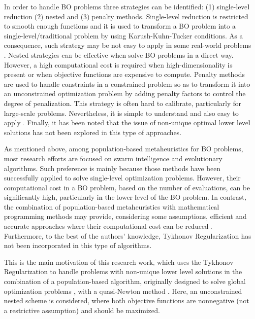 \documentclass[conference]{IEEEtran}
\theoremstyle{definition}
\begin{document}
In order to handle BO problems three strategies can be identified: (1) single-level
reduction (2) nested and (3) penalty methods. Single-level reduction is restricted
to smooth enough functions and it is used to transform a BO problem into a single-level/traditional
problem by using Karush-Kuhn-Tucker conditions. As a consequence, such strategy
may be not easy to apply in some real-world problems  \cite{dempe2002foundations,colson2007overview}. %
Nested strategies can be effective when solve BO problems in a direct way. However, 
a high computational cost is required when high-dimensionality is present or when
objective functions are expensive to compute. Penalty methods are used to handle
constraints in a constrained problem so as to transform it into an unconstrained
optimization problem by adding penalty factors to control the degree of penalization.
This strategy is often hard to calibrate, particularly for large-scale problems.
Nevertheless, it is simple to understand and also easy to apply \cite{savard1994steepest,white1993penalty}.
Finally, it has been noted that the issue of non-unique optimal lower level
solutions has not been explored in this type of approaches.

As mentioned above, among population-based metaheuristics for BO problems, most
research efforts are focused on swarm intelligence and evolutionary algorithms.
Such preference is mainly because those methods have been successfully applied
to solve single-level optimization problems. However, their computational cost
in a BO problem, based on the number of evaluations, can be significantly high,
particularly in the lower level of the BO problem. In contrast, the combination
of population-based metaheuristics with mathematical programming methods may
provide, considering some assumptions, efficient and accurate approaches where
their computational cost can be reduced \cite{sinha2013efficient,wang2005evolutionary}.
Furthermore, to the best of the authors' knowledge, Tykhonov Regularization has
not been incorporated in this type of algorithms. 

This is the main motivation of this research work, which uses the Tykhonov
Regularization \cite{dempe2002foundations} to handle problems with non-unique
lower level solutions in the combination of a population-based algorithm, originally
designed to solve global optimization problems \cite{Mejia2018}, with a quasi-Newton
method \cite{fletcher2013practical}. Here, an unconstrained nested scheme is
considered, where both objective functions are nonnegative (not a restrictive
assumption) and should be maximized.
\end{document}
